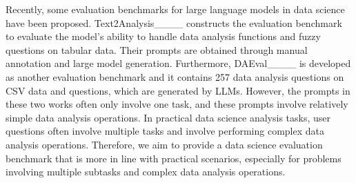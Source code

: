 Recently, some evaluation benchmarks for large language models in data science have been proposed. 
Text2Analysis____ constructs the evaluation benchmark to evaluate the model's ability to handle data analysis functions and fuzzy questions on tabular data. Their prompts are obtained through manual annotation and large model generation.
Furthermore, DAEval____ is developed as another evaluation benchmark and it contains 257 data analysis questions on CSV data and questions, which are generated by LLMs.
However, the prompts in these two works often only involve one task, and these prompts involve relatively simple data analysis operations.
In practical data science analysis tasks, user questions often involve multiple tasks and involve performing complex data analysis operations.
Therefore, we aim to provide a data science evaluation benchmark that is more in line with practical scenarios, especially for problems involving multiple subtasks and complex data analysis operations.